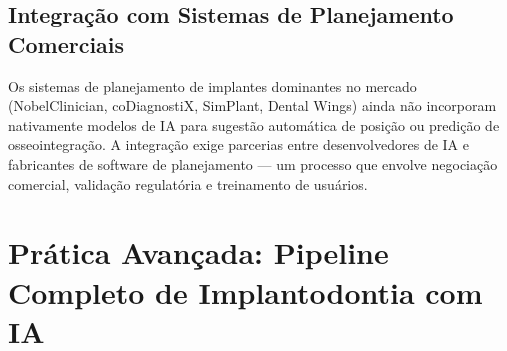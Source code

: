 \subsection{Integração com Sistemas de Planejamento Comerciais}

Os sistemas de planejamento de implantes dominantes no mercado (NobelClinician, coDiagnostiX, SimPlant, Dental Wings) ainda não incorporam nativamente modelos de IA para sugestão automática de posição ou predição de osseointegração. A integração exige parcerias entre desenvolvedores de IA e fabricantes de software de planejamento --- um processo que envolve negociação comercial, validação regulatória e treinamento de usuários.

\section{Prática Avançada: Pipeline Completo de Implantodontia com IA}

